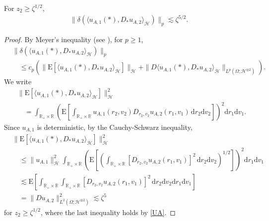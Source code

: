 \documentclass[12pt,a4paper]{article}
\newcommand{\R}{{\mathbb{R}}}
\newcommand{\E}{\mathrm{E}}
\newcommand{\HH}{\mathcal{H}}
\renewcommand{\d}{\mathrm{d}}
\newcommand {\deltah}{{\zeta}}
\newcommand{\<}{\langle}
\renewcommand{\>}{\rangle}
\begin{document}
\begin{lemma}\label{lem:uA1uA2}
          For $z_2\geq \deltah^{1/2}$,
          \begin{align*}%
          \|\delta(\langle u_{A,1}(*), D_{*}u_{A,2}\rangle_{\HH})\|_p  \lesssim \deltah^{5/2}.
          \end{align*}
\end{lemma}
\begin{proof}
          By Meyer's inequality (see \cite[Proposition 1.5.8]{nualart2006}),  for $p\geq1$,
          \begin{align*}
          &\|\delta(\langle u_{A,1}(*), D_{*}u_{A,2}\rangle_{\HH})\|_p\\
          &\quad \leq c_p\left(
          \|\E[\langle u_{A,1}(*), D_{*}u_{A,2}\rangle_{\HH}]\|_\HH + \| D \langle u_{A,1}(*), D_{*}u_{A,2}\rangle_{\HH} \|_{L^p(\Omega; \HH^{\otimes2})}
          \right).
          \end{align*}
          We write
          \begin{align*}
          &\|\E[\langle u_{A,1}(*), D_{*}u_{A,2}\rangle_{\HH}]\|^2_\HH\\
          &\quad= \int_{\R_+\times \R}
          \left(\E\left[\int_{\R_+\times\R}u_{A,1}(r_2,v_2)D_{r_2,v_2}u_{A,2}(r_1,v_1)\, \d r_2\d v_2\right]\right)^2 \d r_1\d v_1.
          \end{align*}
          Since $u_{A,1}$ is deterministic, by the Cauchy-Schwarz inequality, 
          \begin{align*}
                    &\|\E[\langle u_{A,1}(*), D_{*}u_{A,2}\rangle_{\HH}]\|^2_\HH \\
                    &\quad \leq 
           \|u_{A,1}\|_{\HH}^2   \int_{\R_+\times \R}
          \left(\E\left[\left(\int_{\R_+\times\R}[D_{r_2,v_2}u_{A,2}(r_1,v_1)]^2\, \d r_2\d v_2\right)^{1/2}\right]\right)^2 \d r_1\d v_1\\
          &\quad \lesssim   \E\left[ \int_{\R_+\times \R}
          \int_{\R_+\times\R}[D_{r_2,v_2}u_{A,2}(r_1,v_1)]^2\, \d r_2\d v_2 \d r_1\d v_1\right]\\
          &\quad = \|Du_{A,2}\|^2_{L^2(\Omega; \HH^{\otimes2})} \lesssim \deltah^{5}
          \end{align*}
          for $z_2\geq \deltah^{1/2}$, where the last inequality holds by \eqref{UA}.
          

\end{proof}
\end{document}
